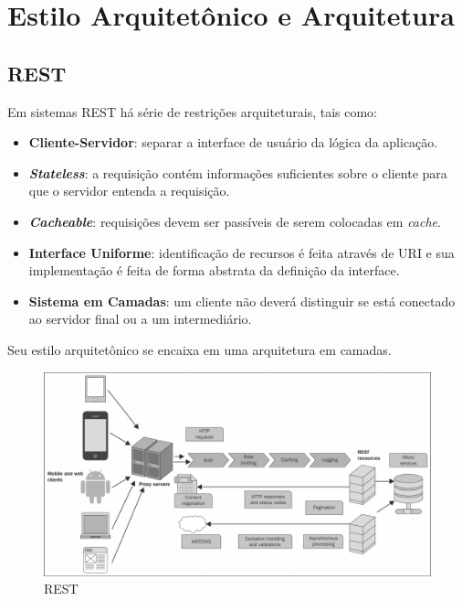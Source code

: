 \section{Estilo Arquitetônico e
Arquitetura}\label{estilo-arquitetuxf4nico-e-arquitetura}

\subsection{REST}\label{rest}

Em sistemas REST há série de restrições arquiteturais, tais como:

\begin{itemize}
\itemsep1pt\parskip0pt
\item
  \textbf{Cliente-Servidor}: separar a interface de usuário da lógica da
  aplicação.
\item
  \textbf{\emph{Stateless}}: a requisição contém informações suficientes
  sobre o cliente para que o servidor entenda a requisição.
\item
  \textbf{\emph{Cacheable}}: requisições devem ser passíveis de serem
  colocadas em \emph{cache}.
\item
  \textbf{Interface Uniforme}: identificação de recursos é feita através
  de URI e sua implementação é feita de forma abstrata da definição da
  interface.
\item
  \textbf{Sistema em Camadas}: um cliente não deverá distinguir se está
  conectado ao servidor final ou a um intermediário.
\end{itemize}

Seu estilo arquitetônico se encaixa em uma arquitetura em camadas.

\begin{figure}[h]
    \includegraphics[scale=1.5]{img/rest.jpg}
    \caption{REST}
\end{figure}

